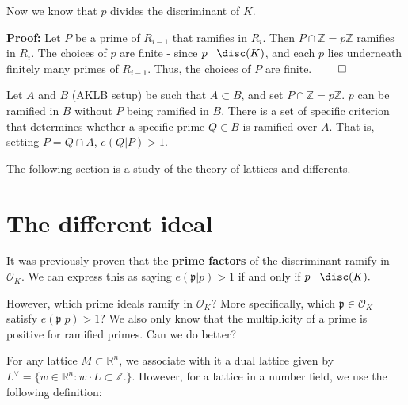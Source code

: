 \documentclass[a4paper, 12pt,oneside,openany]{book}
\begin{document}
Now we know that $p$ divides the discriminant of $K.$ 


\textbf{Proof:} Let $P$ be a prime of $R_{i-1}$ that ramifies in $R_i.$ Then $P \cap \mathbb{Z} = p\mathbb{Z}$ ramifies in $R_i.$ The choices of $p$ are finite - since $p \mid \disc(K)$, and each $p$ lies underneath finitely many primes of $R_{i-1}.$ Thus, the choices of $P$ are finite. $\qed$

Let $A$ and $B$ (AKLB setup) be such that $A \subset B$, and set $P \cap \mathbb{Z} = p\mathbb{Z}$. $p$ can be ramified in $B$ without $P$ being ramified in $B$. There is a set of specific criterion that determines whether a specific prime $Q \in B$ is ramified over $A.$ That is, setting $P=Q \cap A$, $e(Q|P)>1.$

The following section is a study of the theory of lattices and differents.

\section{The different ideal}

It was previously proven that the \textbf{prime factors} of the discriminant ramify in $\mathcal{O}_K.$ We can express this as saying $e(\mathfrak{p}|p)>1$ if and only if $p \mid \disc(K).$  

However, which prime ideals ramify in $\mathcal{O}_K?$ More specifically, which $\mathfrak{p} \in \mathcal{O}_K$ satisfy $e(\mathfrak{p}|p)>1?$ We also only know that the multiplicity of a prime is positive for ramified primes. Can we do better?


For any lattice $M \subset \mathbb{R}^n$, we associate with it a dual lattice given by $L^{\vee}=\{w \in \mathbb{R}^n: w \cdot L \subset \mathbb{Z}.\}$. However, for a lattice in a number field, we use the following definition:

\end{document}
